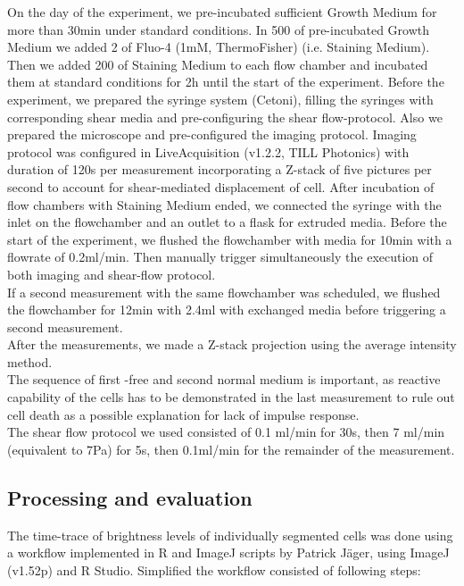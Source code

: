 On the day of the experiment, we pre-incubated sufficient Growth Medium for more than 30min under standard conditions. In 500\mul{} of pre-incubated Growth Medium we added 2\mul{} of Fluo-4 (1mM, ThermoFisher) (i.e. Staining Medium). Then we added 200\mul{} of Staining Medium to each flow chamber and incubated them at standard conditions for 2h until the start of the experiment. Before the experiment, we prepared the syringe system (Cetoni), filling the syringes with corresponding shear media and pre-configuring the shear flow-protocol. Also we prepared the microscope and pre-configured the imaging protocol. Imaging protocol was configured in LiveAcquisition (v1.2.2, TILL Photonics) with duration of 120s per measurement incorporating a Z-stack of five pictures per second to account for shear-mediated displacement of cell.
After incubation of flow chambers with Staining Medium ended, we connected the syringe with the inlet on the flowchamber and an outlet to a flask for extruded media. Before the start of the experiment, we flushed the flowchamber with media for 10min with a flowrate of 0.2ml/min. Then manually trigger simultaneously the execution of both imaging and shear-flow protocol.\\
If a second measurement with the same flowchamber was scheduled, we flushed the flowchamber for 12min with 2.4ml with exchanged media before triggering a second measurement.\\
After the measurements, we made a Z-stack projection using the average intensity method.\\
The sequence of first \calcium{}-free and second normal medium is important, as reactive capability of the cells has to be demonstrated in the last measurement to rule out cell death as a possible explanation for lack of impulse response.\\
The shear flow protocol we used consisted of 0.1 ml/min for 30s, then 7 ml/min (equivalent to 7Pa) for 5s, then 0.1ml/min for the remainder of the measurement. 

\subsection{Processing and evaluation}
\label{sub:Processing}

The time-trace of brightness levels of individually segmented cells was done using a workflow implemented in R and ImageJ scripts by Patrick Jäger, using ImageJ (v1.52p) and R Studio. Simplified the workflow consisted of following steps:

